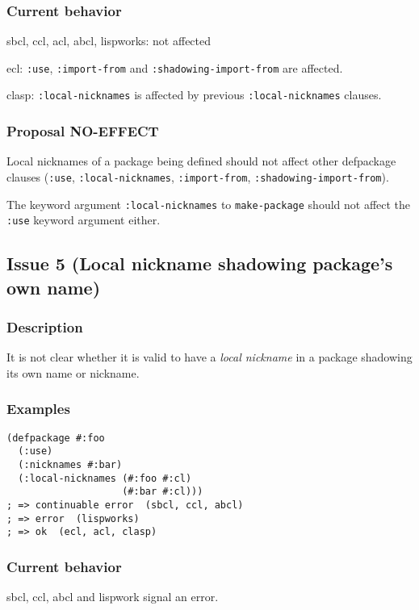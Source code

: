 \documentclass[11pt]{article}
\begin{document}
\subsubsection{Current behavior}
\label{sec:org51ee048}
sbcl, ccl, acl, abcl, lispworks: not affected

ecl: \texttt{:use}, \texttt{:import-from} and \texttt{:shadowing-import-from} are affected.

clasp: \texttt{:local-nicknames} is affected by previous \texttt{:local-nicknames} clauses.
\subsubsection{Proposal NO-EFFECT}
\label{sec:orgf637172}
Local nicknames of a package being defined should not affect other defpackage
clauses (\texttt{:use}, \texttt{:local-nicknames}, \texttt{:import-from}, \texttt{:shadowing-import-from}).

The keyword argument \texttt{:local-nicknames} to \texttt{make-package} should not affect the
\texttt{:use} keyword argument either.

\subsection{Issue 5 (Local nickname shadowing package's own name)}
\label{sec:org1879459}
\subsubsection{Description}
\label{sec:org1c5ce30}
It is not clear whether it is valid to have a \emph{local nickname} in a package
shadowing its own name or nickname.
\subsubsection{Examples}
\label{sec:orgfcf218f}
\begin{verbatim}
(defpackage #:foo
  (:use)
  (:nicknames #:bar)
  (:local-nicknames (#:foo #:cl)
                    (#:bar #:cl)))
; => continuable error  (sbcl, ccl, abcl)
; => error  (lispworks)
; => ok  (ecl, acl, clasp)
\end{verbatim}
\subsubsection{Current behavior}
\label{sec:orgd2fd682}
sbcl, ccl, abcl and lispwork signal an error.
\end{document}

